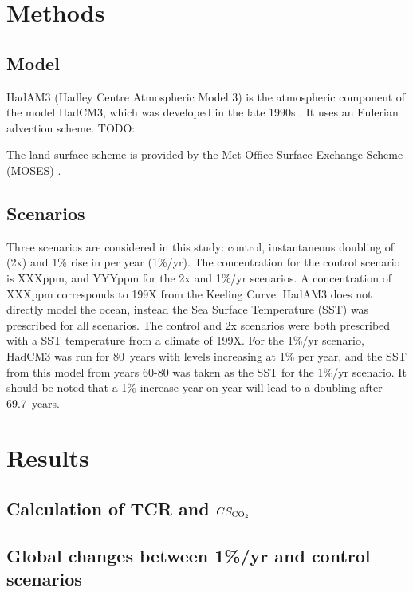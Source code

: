 \documentclass{article}
\begin{document}
\section{Methods}

\subsection{Model}

HadAM3 (Hadley Centre Atmospheric Model 3) is the atmospheric component of the model HadCM3, which was developed in the late 1990s \parencite{pope2000impact}. It uses an Eulerian advection scheme. TODO:

The land surface scheme is provided by the Met Office Surface Exchange Scheme (MOSES) \parencite{cox1999impact}.


\subsection{Scenarios}

Three scenarios are considered in this study: control, instantaneous doubling of  (2x) and 1\% rise in  per year (1\%/yr). The  concentration for the control scenario is XXXppm, and YYYppm for the 2x and 1\%/yr scenarios. A concentration of XXXppm corresponds to 199X from the Keeling Curve. HadAM3 does not directly model the ocean, instead the Sea Surface Temperature (SST) was prescribed for all scenarios. The control and 2x scenarios were both prescribed with a SST temperature from a climate of 199X. For the 1\%/yr scenario, HadCM3 was run for \SI{80}{years} with  levels increasing at 1\% per year, and the SST from this model from years 60-80 was taken as the SST for the 1\%/yr scenario. It should be noted that a 1\% increase year on year will lead to a doubling after \SI{69.7}{years}.

\newpage
\section{Results}

\subsection{Calculation of TCR and $CS_{\ce{CO2}}$}

\subsection{Global changes between 1\%/yr and control scenarios}
\end{document}
